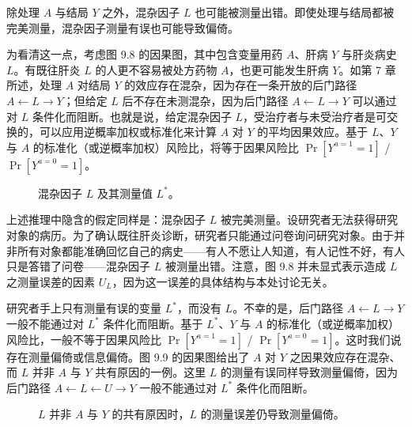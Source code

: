 除处理 $A$ 与结局 $Y$ 之外，混杂因子 $L$ 也可能被测量出错。即使处理与结局都被完美测量，混杂因子测量有误也可能导致偏倚。

为看清这一点，考虑图 9.8 的因果图，其中包含变量用药 $A$、肝病 $Y$ 与肝炎病史 $L$。有既往肝炎 $L$ 的人更不容易被处方药物 $A$，也更可能发生肝病 $Y$。如第 7 章所述，处理 $A$ 对结局 $Y$ 的效应存在混杂，因为存在一条开放的后门路径 $A\leftarrow L\rightarrow Y$；但给定 $L$ 后不存在未测混杂，因为后门路径 $A\leftarrow L\rightarrow Y$ 可以通过对 $L$ 条件化而阻断。也就是说，给定混杂因子 $L$，受治疗者与未受治疗者是可交换的，可以应用逆概率加权或标准化来计算 $A$ 对 $Y$ 的平均因果效应。基于 $L$、$Y$ 与 $A$ 的标准化（或逆概率加权）风险比，将等于因果风险比 $\Pr[Y^{a=1}=1]$ / $\Pr[Y^{a=0}=1]$。

\begin{figure}[htbp]
\centering
{}
\caption{混杂因子 $L$ 及其测量值 $L^{*}$。}
\label{fig:9.8}
\end{figure}

上述推理中隐含的假定同样是：混杂因子 $L$ 被完美测量。设研究者无法获得研究对象的病历。为了确认既往肝炎诊断，研究者只能通过问卷询问研究对象。由于并非所有对象都能准确回忆自己的病史——有人不愿让人知道，有人记性不好，有人只是答错了问卷——混杂因子 $L$ 被测量出错。注意，图 9.8 并未显式表示造成 $L$ 之测量误差的因素 $U_L$，因为这一误差的具体结构与本处讨论无关。

研究者手上只有测量有误的变量 $L^{*}$，而没有 $L$。不幸的是，后门路径 $A\leftarrow L\rightarrow Y$ 一般不能通过对 $L^{*}$ 条件化而阻断。基于 $L^{*}$、$Y$ 与 $A$ 的标准化（或逆概率加权）风险比，一般不等于因果风险比 $\Pr[Y^{a=1}=1]$ / $\Pr[Y^{a=0}=1]$。这时我们说存在测量偏倚或信息偏倚。图 9.9 的因果图给出了 $A$ 对 $Y$ 之因果效应存在混杂、而 $L$ 并非 $A$ 与 $Y$ 共有原因的一例。这里 $L$ 的测量有误同样导致测量偏倚，因为后门路径 $A\leftarrow L\leftarrow U\rightarrow Y$ 一般不能通过对 $L^{*}$ 条件化而阻断。

\begin{figure}[htbp]
\centering
{}
\caption{$L$ 并非 $A$ 与 $Y$ 的共有原因时，$L$ 的测量误差仍导致测量偏倚。}
\label{fig:9.9}
\end{figure}

